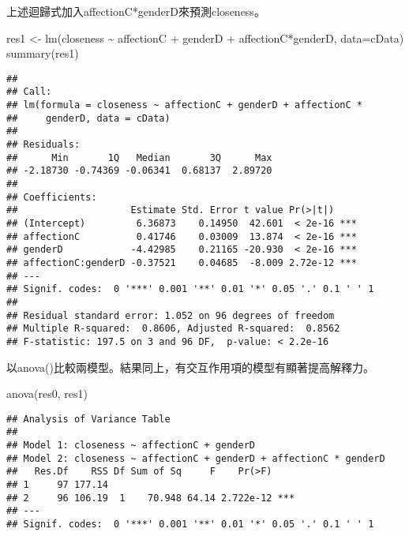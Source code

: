 \documentclass[
]{book}
\newenvironment{Shaded}{\begin{snugshade}}{\end{snugshade}}
\newcommand{\AttributeTok}[1]{\textcolor[rgb]{0.77,0.63,0.00}{#1}}
\newcommand{\FunctionTok}[1]{\textcolor[rgb]{0.00,0.00,0.00}{#1}}
\newcommand{\NormalTok}[1]{#1}
\newcommand{\OtherTok}[1]{\textcolor[rgb]{0.56,0.35,0.01}{#1}}
\newcommand{\SpecialCharTok}[1]{\textcolor[rgb]{0.00,0.00,0.00}{#1}}
\begin{document}
上述迴歸式加入affectionC*genderD來預測closeness。

\begin{Shaded}
\begin{Highlighting}[]
\NormalTok{res1 }\OtherTok{\textless{}{-}} \FunctionTok{lm}\NormalTok{(closeness }\SpecialCharTok{\textasciitilde{}}\NormalTok{ affectionC }\SpecialCharTok{+}\NormalTok{ genderD }\SpecialCharTok{+}\NormalTok{ affectionC}\SpecialCharTok{*}\NormalTok{genderD, }\AttributeTok{data=}\NormalTok{cData)}
\FunctionTok{summary}\NormalTok{(res1)}
\end{Highlighting}
\end{Shaded}

\begin{verbatim}
## 
## Call:
## lm(formula = closeness ~ affectionC + genderD + affectionC * 
##     genderD, data = cData)
## 
## Residuals:
##      Min       1Q   Median       3Q      Max 
## -2.18730 -0.74369 -0.06341  0.68137  2.89720 
## 
## Coefficients:
##                    Estimate Std. Error t value Pr(>|t|)    
## (Intercept)         6.36873    0.14950  42.601  < 2e-16 ***
## affectionC          0.41746    0.03009  13.874  < 2e-16 ***
## genderD            -4.42985    0.21165 -20.930  < 2e-16 ***
## affectionC:genderD -0.37521    0.04685  -8.009 2.72e-12 ***
## ---
## Signif. codes:  0 '***' 0.001 '**' 0.01 '*' 0.05 '.' 0.1 ' ' 1
## 
## Residual standard error: 1.052 on 96 degrees of freedom
## Multiple R-squared:  0.8606, Adjusted R-squared:  0.8562 
## F-statistic: 197.5 on 3 and 96 DF,  p-value: < 2.2e-16
\end{verbatim}

以anova()比較兩模型。結果同上，有交互作用項的模型有顯著提高解釋力。

\begin{Shaded}
\begin{Highlighting}[]
\FunctionTok{anova}\NormalTok{(res0, res1)}
\end{Highlighting}
\end{Shaded}

\begin{verbatim}
## Analysis of Variance Table
## 
## Model 1: closeness ~ affectionC + genderD
## Model 2: closeness ~ affectionC + genderD + affectionC * genderD
##   Res.Df    RSS Df Sum of Sq     F    Pr(>F)    
## 1     97 177.14                                 
## 2     96 106.19  1    70.948 64.14 2.722e-12 ***
## ---
## Signif. codes:  0 '***' 0.001 '**' 0.01 '*' 0.05 '.' 0.1 ' ' 1
\end{verbatim}
\end{document}
